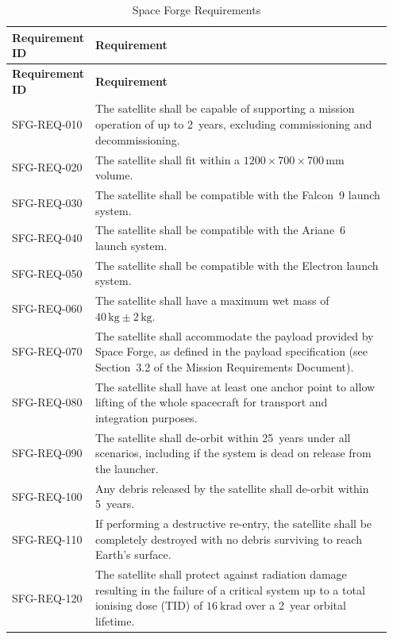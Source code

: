 \documentclass[a4paper, 11pt, conference]{IEEEtran}
\begin{document}
{\footnotesize
\renewcommand{\arraystretch}{1.2}
\begin{longtable}{@{}p{0.15\linewidth}p{0.80\linewidth}@{}}
\caption{Space Forge Requirements}
\label{tab:spaceforge-reqs} \\

\toprule
\textbf{Requirement ID} & \textbf{Requirement} \\
\midrule
\endfirsthead

\toprule
\textbf{Requirement ID} & \textbf{Requirement} \\
\midrule
\endhead

SFG-REQ-010 & The satellite shall be capable of supporting a mission operation of up to 2~years, excluding commissioning and decommissioning. \\
SFG-REQ-020 & The satellite shall fit within a $1200 \times 700 \times 700\,\mathrm{mm}$ volume. \\
SFG-REQ-030 & The satellite shall be compatible with the Falcon~9 launch system. \\
SFG-REQ-040 & The satellite shall be compatible with the Ariane~6 launch system. \\
SFG-REQ-050 & The satellite shall be compatible with the Electron launch system. \\
SFG-REQ-060 & The satellite shall have a maximum wet mass of $40\,\mathrm{kg}\pm 2\,\mathrm{kg}$. \\
SFG-REQ-070 & The satellite shall accommodate the payload provided by Space Forge, as defined in the payload specification (see Section~3.2 of the Mission Requirements Document). \\
SFG-REQ-080 & The satellite shall have at least one anchor point to allow lifting of the whole spacecraft for transport and integration purposes. \\
SFG-REQ-090 & The satellite shall de-orbit within 25~years under all scenarios, including if the system is dead on release from the launcher. \\
SFG-REQ-100 & Any debris released by the satellite shall de-orbit within 5~years. \\
SFG-REQ-110 & If performing a destructive re-entry, the satellite shall be completely destroyed with no debris surviving to reach Earth's surface. \\
SFG-REQ-120 & The satellite shall protect against radiation damage resulting in the failure of a critical system up to a total ionising dose (TID) of $16~\mathrm{krad}$ over a 2~year orbital lifetime. \\

\end{longtable}}
\end{document}

